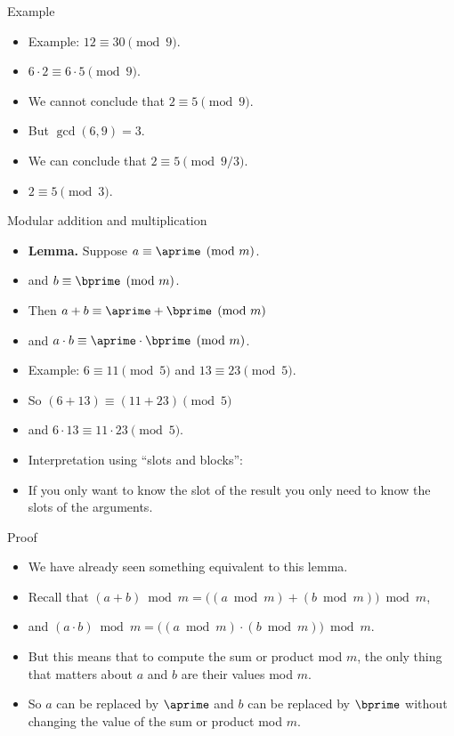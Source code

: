 \documentclass{beamer}
\begin{document}
\begin{frame}{Example}
\begin{itemize}
  \item Example: $12 \equiv 30 \pmod {9}$.
  \item $6 \cdot 2 \equiv 6 \cdot 5 \pmod {9}$.
  \item We cannot conclude that $2\equiv 5 \pmod {9}$.
  \item But $\gcd(6,9) = 3$.
  \item We can conclude that $2\equiv 5 \pmod {9/3}$.
  \item $2\equiv 5 \pmod 3$.
\end{itemize}
\end{frame}

\begin{frame}{Modular addition and multiplication}
\begin{itemize}
  \item \textbf{Lemma.} Suppose $a \equiv \aprime \pmod {m}$.
  \item and $b  \equiv \bprime \pmod {m}$.
  \item Then $a+b \equiv \aprime + \bprime \pmod {m}$
  \item and $a \cdot b \equiv \aprime \cdot \bprime \pmod {m}$.
  \item Example: $6 \equiv 11 \pmod 5$ and $13\equiv 23 \pmod 5$.
  \item So $(6+13) \equiv (11 +23) \pmod 5$
  \item and  $6\cdot 13 \equiv 11\cdot 23 \pmod 5$.
  \item Interpretation using ``slots and blocks'':
  \item If you only want to know the slot
  of the result you only need to know the slots of the arguments.
\end{itemize}
\end{frame}

\begin{frame}{Proof}
\begin{itemize}
  \item We have already seen something equivalent to this lemma.
  \item Recall that $(a+b)\bmod m = \big( (a\bmod m) + (b\bmod m) \big) \bmod m$,
  \item and $(a\cdot b)\bmod m = \big( (a\bmod m) \cdot (b\bmod m) \big) \bmod m$.
  \item But this means that to compute the sum or product mod $m$, the only thing that
  matters about $a$ and $b$ are their values mod $m$.
  \item So $a$ can be replaced by
  $\aprime$ and $b$ can be replaced by $\bprime$ without changing the value of
  the sum or product mod $m$.
\end{itemize}
\end{frame}
\end{document}
